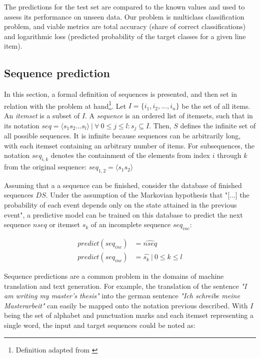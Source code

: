The predictions for the test set are compared to the known values and used to assess its performance on unseen data. Our problem is multiclass classification problem, and viable metrics are total accuracy (share of correct classifications) and logarithmic loss (predicted probability of the target classes for a given line item).

\subsection{Sequence prediction}
In this section, a formal definition of sequences is presented, and then set in relation with the problem at hand\footnote{Definition adapted from \cite{pei2001prefixspan}}.  Let $I = \{i_1, i_2, ..., i_n\}$ be the set of all items. An \textit{itemset} is a subset of $I$. A \textit{sequence} is an ordered list of itemsets, such that in its notation $seq = \langle s_1s_2...s_l \rangle\ |\ \forall\ 0 \leq j \leq l: s_j \subseteq I$. Then, $S$ defines the infinite set of all possible sequences. It is infinite because sequences can be arbitrarily long, with each itemset containing an arbitrary number of items. For  subsequences, the notation $seq_{i,k}$ denotes the containment of the elements from index $i$ through $k$ from the original sequence: $seq_{1,2} = \langle s_1s_2 \rangle$

Assuming that a a sequence can be finished, consider the database of finished sequences $DS$. Under the assumption of the Markovian hypothesis that "[...] the probability of each event depends only on the state attained in the previous event"\cite{gagniuc2017markov}, a predictive model can be trained on this database to predict the next sequence $nseq$ or itemset $s_k$ of an incomplete sequence $seq_{inc}$:

\begin{equation}
\begin{split}
    predict(seq_{inc}) &= \widehat{nseq}\\
    predict(seq_{inc}) &= \hat{s_k}\ |\ 0 \leq k \leq l
\end{split}
\label{eq:prediction-from-sequence}
\end{equation}

Sequence predictions are a common problem in the domains of machine translation and text generation. For example, the translation of the sentence \textit{"I am writing my master's thesis"} into the german sentence \textit{"Ich schreibe meine Masterarbeit"} can easily be mapped onto the notation previous described. With $I$ being the set of alphabet and punctuation marks and each itemset representing a single word, the input and target sequences could be noted as:

